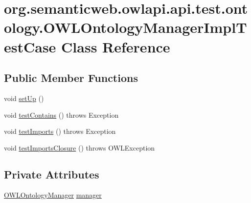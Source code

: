 \hypertarget{classorg_1_1semanticweb_1_1owlapi_1_1api_1_1test_1_1ontology_1_1_o_w_l_ontology_manager_impl_test_case}{\section{org.\-semanticweb.\-owlapi.\-api.\-test.\-ontology.\-O\-W\-L\-Ontology\-Manager\-Impl\-Test\-Case Class Reference}
\label{classorg_1_1semanticweb_1_1owlapi_1_1api_1_1test_1_1ontology_1_1_o_w_l_ontology_manager_impl_test_case}
}
\subsection*{Public Member Functions}
\begin{DoxyCompactItemize}
\item 
void \hyperlink{classorg_1_1semanticweb_1_1owlapi_1_1api_1_1test_1_1ontology_1_1_o_w_l_ontology_manager_impl_test_case_ae6106592ced9a11d6354e005d6b4f9f3}{set\-Up} ()
\item 
void \hyperlink{classorg_1_1semanticweb_1_1owlapi_1_1api_1_1test_1_1ontology_1_1_o_w_l_ontology_manager_impl_test_case_a7348e2f511b37c2ee1cf468404f952e2}{test\-Contains} ()  throws Exception 
\item 
void \hyperlink{classorg_1_1semanticweb_1_1owlapi_1_1api_1_1test_1_1ontology_1_1_o_w_l_ontology_manager_impl_test_case_ad23b5dacbb7f87d6ec6b4ff48456f956}{test\-Imports} ()  throws Exception 
\item 
void \hyperlink{classorg_1_1semanticweb_1_1owlapi_1_1api_1_1test_1_1ontology_1_1_o_w_l_ontology_manager_impl_test_case_a6d7e5f4bd538b17264a194d68e0d4e6a}{test\-Imports\-Closure} ()  throws O\-W\-L\-Exception 
\end{DoxyCompactItemize}
\subsection*{Private Attributes}
\begin{DoxyCompactItemize}
\item 
\hyperlink{interfaceorg_1_1semanticweb_1_1owlapi_1_1model_1_1_o_w_l_ontology_manager}{O\-W\-L\-Ontology\-Manager} \hyperlink{classorg_1_1semanticweb_1_1owlapi_1_1api_1_1test_1_1ontology_1_1_o_w_l_ontology_manager_impl_test_case_af725ff972213852fbd95a52362fcdfa1}{manager}
\end{DoxyCompactItemize}


